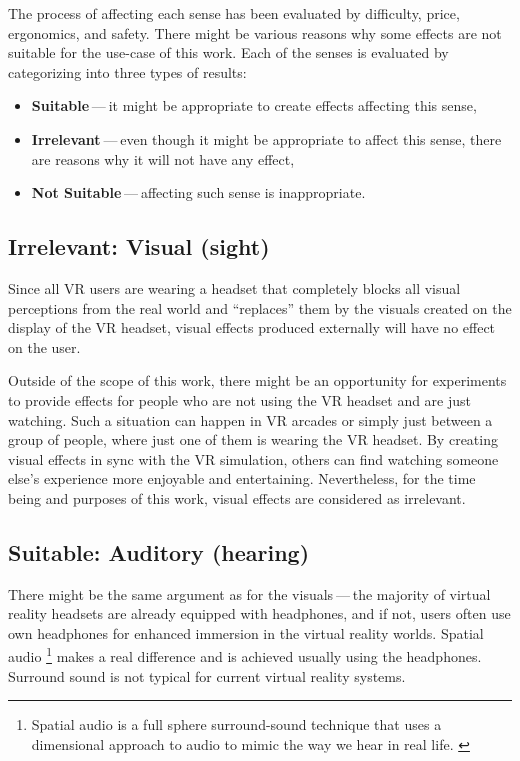 The process of affecting each sense has been evaluated by difficulty,
price, ergonomics, and safety. There might be various reasons why some
effects are not suitable for the use-case of this work.
Each of the senses is evaluated by categorizing into three types of results:


\begin{itemize}
  \itemsep0em

  \item \textbf{Suitable} — it might be appropriate to create effects affecting this sense,

  \item \textbf{Irrelevant} — even though it might be appropriate to affect this sense,
  there are reasons why it will not have any effect,

  \item \textbf{Not Suitable} — affecting such sense is inappropriate.

\end{itemize}


\hypertarget{x-irrelevant:-visual-(sight)}{\subsection{Irrelevant: Visual (sight)}}
Since all VR users are wearing a headset that completely blocks
all visual perceptions from the real world and ``replaces'' them by the visuals
created on the display of the VR headset, visual effects produced externally
will have no effect on the user.


Outside of the scope of this work, there might be an opportunity for experiments
to provide effects for people who are not using the VR headset and are
just watching. Such a situation can happen in VR arcades or simply
just between a group of people, where just one of them is wearing the VR headset.
By creating visual effects in sync with the VR
simulation, others can find watching someone else's experience
more enjoyable and entertaining. Nevertheless, for the time being and purposes
of this work, visual effects are considered as irrelevant.


\hypertarget{x-suitable:-auditory-(hearing)}{\subsection{Suitable: Auditory (hearing)}}
There might be the same argument as for the visuals — the majority of virtual reality headsets are already equipped with
headphones, and if not, users often use own headphones for
enhanced immersion in the virtual reality worlds.
Spatial audio
\footnote{Spatial audio is a full sphere surround-sound technique that uses a 
dimensional approach to audio to mimic the way we hear in real life. \cite{spaudio}}
makes a real difference and is achieved usually using the headphones.
Surround sound is not typical for current virtual reality systems.

